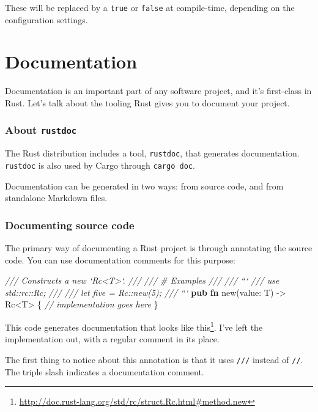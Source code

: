 \documentclass[a4paper,]{book}
\renewcommand*{\hypertarget}[3][\ar]{%
  \def\ar{#2}%
  \label{#1}%
  #3}
\newenvironment{Shaded}{\begin{snugshade}}{\end{snugshade}}
\newcommand{\KeywordTok}[1]{\textcolor[rgb]{0.13,0.29,0.53}{\textbf{{#1}}}}
\newcommand{\CommentTok}[1]{\textcolor[rgb]{0.56,0.35,0.01}{\textit{{#1}}}}
\newcommand{\NormalTok}[1]{{#1}}
\renewcommand{\href}[2]{#2\footnote{\url{#1}}}
\begin{document}
These will be replaced by a \texttt{true} or \texttt{false} at
compile-time, depending on the configuration settings.

\hypertarget{sec--documentation}{\section{Documentation}\label{sec--documentation}}

Documentation is an important part of any software project, and it's
first-class in Rust. Let's talk about the tooling Rust gives you to
document your project.

\subsubsection{\texorpdfstring{About
\texttt{rustdoc}}{About rustdoc}}\label{about-rustdoc}

The Rust distribution includes a tool, \texttt{rustdoc}, that generates
documentation. \texttt{rustdoc} is also used by Cargo through
\texttt{cargo\ doc}.

Documentation can be generated in two ways: from source code, and from
standalone Markdown files.

\subsubsection{Documenting source code}\label{documenting-source-code}

The primary way of documenting a Rust project is through annotating the
source code. You can use documentation comments for this purpose:

\begin{Shaded}
\begin{Highlighting}[]
\CommentTok{/// Constructs a new `Rc<T>`.}
\CommentTok{///}
\CommentTok{/// # Examples}
\CommentTok{///}
\CommentTok{/// ```}
\CommentTok{/// use std::rc::Rc;}
\CommentTok{///}
\CommentTok{/// let five = Rc::new(5);}
\CommentTok{/// ```}
\KeywordTok{pub} \KeywordTok{fn} \NormalTok{new(value: T) -> Rc<T> \{}
    \CommentTok{// implementation goes here}
\NormalTok{\}}
\end{Highlighting}
\end{Shaded}

This code generates documentation that looks
\href{http://doc.rust-lang.org/std/rc/struct.Rc.html\#method.new}{like
this}. I've left the implementation out, with a regular comment in its
place.

The first thing to notice about this annotation is that it uses
\texttt{///} instead of \texttt{//}. The triple slash indicates a
documentation comment.
\end{document}
